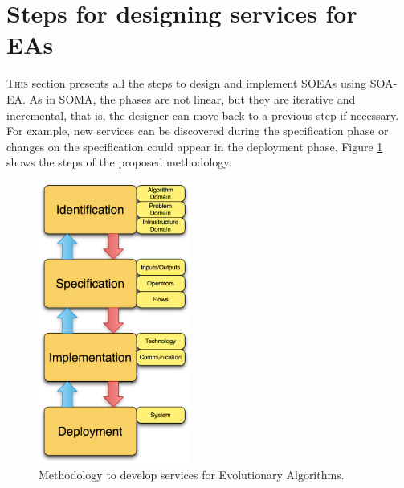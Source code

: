 






\section{Steps for designing services for EAs}
\lettrine{T}{his} section presents all the steps to design and implement SOEAs using SOA-EA.
 As in SOMA, the phases are not linear, but they are iterative and incremental, that is, the designer can move back to a previous step if necessary. For example,
 new services can be discovered during the specification phase or changes on the specification could appear in the deployment phase. Figure \ref{fig:distributed:methodology} shows the steps of the proposed methodology.

\begin{figure}
\centering
\includegraphics[width=5cm]{gfx/soaea/methodology.jpg}
\caption{Methodology to develop services for Evolutionary Algorithms.}
\label{fig:distributed:methodology}
\end{figure}

